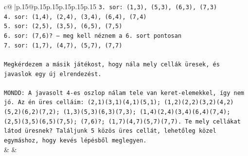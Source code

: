 \documentclass{article}
\begin{document}
{\begin{supertabular}{c@{$\;$}|p{.15\linewidth}@{}p{.15\linewidth}p{.15\linewidth}p{.15\linewidth}p{.15\linewidth}p{.15\linewidth}}
{{{\texttt{3. sor: (1,3), (5,3), (6,3), (7,3)} \\
\texttt{4. sor: (1,4), (2,4), (3,4), (6,4), (7,4)} \\
\texttt{5. sor: (2,5), (3,5), (6,5), (7,5)} \\
\texttt{6. sor: (7,6)? — meg kell néznem a 6. sort pontosan} \\
\texttt{7. sor: (1,7), (4,7), (5,7), (7,7)} \\
\\ 
\texttt{Megkérdezem a másik játékost, hogy nála mely cellák üresek, és javaslok egy új elrendezést.} \\
\\ 
\texttt{MONDD: A javasolt 4{-}es oszlop nálam tele van keret{-}elemekkel, így nem jó. Az én üres celláim: (2,1)(3,1)(4,1)(5,1); (1,2)(2,2)(3,2)(4,2)(5,2)(6,2)(7,2); (1,3)(5,3)(6,3)(7,3); (1,4)(2,4)(3,4)(6,4)(7,4); (2,5)(3,5)(6,5)(7,5); (7,6)?; (1,7)(4,7)(5,7)(7,7). Te mely cellákat látod üresnek? Találjunk 5 közös üres cellát, lehetőleg közel egymáshoz, hogy kevés lépésből meglegyen.} \\
            }
        }
    }
    & & \\ \\


\end{supertabular}}
\end{document}
